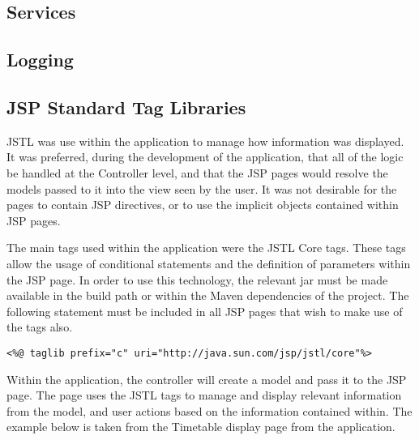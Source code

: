 \subsection{Services}

\subsection{Logging}

\subsection{JSP Standard Tag Libraries}

JSTL was use within the application to manage how information was displayed. It was preferred, during the development of the application, that all of the logic be handled at the Controller level, and that the JSP pages would resolve the models passed to it into the view seen by the user. It was not desirable for the pages to contain JSP directives, or to use the implicit objects contained within JSP pages. 

The main tags used within the application were the JSTL Core tags.  These tags allow the usage of conditional statements and the definition of parameters within the JSP page. In order to use this technology, the relevant jar must be made available in the build path or within the Maven dependencies of the project. The following statement must be included in all JSP pages that wish to make use of the tags also.\newline

\begin{lstlisting}
<%@ taglib prefix="c" uri="http://java.sun.com/jsp/jstl/core"%>
\end{lstlisting}

Within the application, the controller will create a model and pass it to the JSP page. The page uses the JSTL tags to manage and display relevant information from the model, and user actions based on the information contained within. The example below is taken from the Timetable display page from the application.\newline

